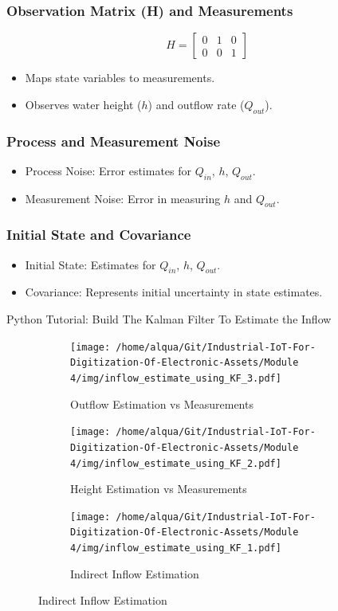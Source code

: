 \documentclass[aspectratio=169,hyperref={pdfpagelabels=false}]{beamer}
\begin{document}
  \begin{frame}
  \frametitle{Observation Matrix (H) and Measurements}
      \[ H = \begin{bmatrix} 0 & 1 & 0 \\ 0 & 0 & 1 \end{bmatrix} \]
      \begin{itemize}
          \item Maps state variables to measurements.
          \item Observes water height (\(h\)) and outflow rate (\(Q_{out}\)).
      \end{itemize}
  \end{frame}
  
  \begin{frame}
  \frametitle{Process and Measurement Noise}
      \begin{itemize}
          \item Process Noise: Error estimates for \(Q_{in}\), \(h\), \(Q_{out}\).
          \item Measurement Noise: Error in measuring \(h\) and \(Q_{out}\).
      \end{itemize}
  \end{frame}
  
  \begin{frame}
  \frametitle{Initial State and Covariance}
      \begin{itemize}
          \item Initial State: Estimates for \(Q_{in}\), \(h\), \(Q_{out}\).
          \item Covariance: Represents initial uncertainty in state estimates.
      \end{itemize}
  \end{frame}

  \begin{frame}{\normalsize{Python Tutorial: Build The Kalman Filter To Estimate the Inflow}}
    \begin{figure}
      \centering
      \begin{subfigure}[b]{0.3\textwidth}
          \texttt{[image: /home/alqua/Git/Industrial-IoT-For-Digitization-Of-Electronic-Assets/Module 4/img/inflow\_estimate\_using\_KF\_3.pdf]}
          \caption{Outflow Estimation vs Measurements}
          \label{fig:image1}
      \end{subfigure}
      \hfill
      \begin{subfigure}[b]{0.3\textwidth}
          \texttt{[image: /home/alqua/Git/Industrial-IoT-For-Digitization-Of-Electronic-Assets/Module 4/img/inflow\_estimate\_using\_KF\_2.pdf]}
          \caption{Height Estimation vs Measurements}
          \label{fig:image2}
      \end{subfigure}
      \hfill
      \begin{subfigure}[b]{0.3\textwidth}
          \texttt{[image: /home/alqua/Git/Industrial-IoT-For-Digitization-Of-Electronic-Assets/Module 4/img/inflow\_estimate\_using\_KF\_1.pdf]}
          \caption{Indirect Inflow Estimation}
          \label{fig:image3}
      \end{subfigure}
      \end{figure}
  \end{frame}
\end{document}
